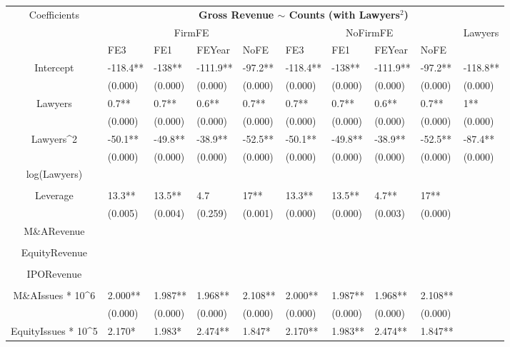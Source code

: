 \documentclass{article}
\begin{document}
\begin{table}[H]
\centering
\begin{tabular}{|clllllllll|}
\hline
\multirow{3}{*}{Coefficients} & \multicolumn{9}{c|}{\textbf{Gross Revenue $\sim$ Counts (with Lawyers$^2$)}} \\
\cline{2-10}
& \multicolumn{4}{c}{FirmFE} & \multicolumn{4}{c}{NoFirmFE} & \multirow{2}{*}{Lawyers} \\
\cline{2-9}
& FE3 & FE1 & FEYear & NoFE & FE3 & FE1 & FEYear & NoFE &  \\
\hline
 
Intercept & -118.4** & -138** & -111.9** & -97.2** & -118.4** & -138** & -111.9** & -97.2** & -118.8** \\ 
   & (0.000) & (0.000) & (0.000) & (0.000) & (0.000) & (0.000) & (0.000) & (0.000) & (0.000) \\ 
  Lawyers & 0.7** & 0.7** & 0.6** & 0.7** & 0.7** & 0.7** & 0.6** & 0.7** & 1** \\ 
   & (0.000) & (0.000) & (0.000) & (0.000) & (0.000) & (0.000) & (0.000) & (0.000) & (0.000) \\ 
  Lawyers^2 & -50.1** & -49.8** & -38.9** & -52.5** & -50.1** & -49.8** & -38.9** & -52.5** & -87.4** \\ 
   & (0.000) & (0.000) & (0.000) & (0.000) & (0.000) & (0.000) & (0.000) & (0.000) & (0.000) \\ 
  log(Lawyers) &  &  &  &  &  &  &  &  &  \\ 
   &  &  &  &  &  &  &  &  &  \\ 
  Leverage & 13.3** & 13.5** & 4.7 & 17** & 13.3** & 13.5** & 4.7** & 17** &  \\ 
   & (0.005) & (0.004) & (0.259) & (0.001) & (0.000) & (0.000) & (0.003) & (0.000) &  \\ 
  M\&ARevenue &  &  &  &  &  &  &  &  &  \\ 
   &  &  &  &  &  &  &  &  &  \\ 
  EquityRevenue &  &  &  &  &  &  &  &  &  \\ 
   &  &  &  &  &  &  &  &  &  \\ 
  IPORevenue &  &  &  &  &  &  &  &  &  \\ 
   &  &  &  &  &  &  &  &  &  \\ 
  M\&AIssues * 10^6 & 2.000** & 1.987** & 1.968** & 2.108** & 2.000** & 1.987** & 1.968** & 2.108** &  \\ 
   & (0.000) & (0.000) & (0.000) & (0.000) & (0.000) & (0.000) & (0.000) & (0.000) &  \\ 
  EquityIssues * 10^5 & 2.170* & 1.983* & 2.474** & 1.847* & 2.170** & 1.983** & 2.474** & 1.847** &  \\ 

\end{tabular}
\end{table}
\end{document}
